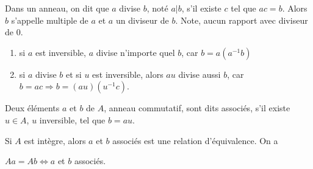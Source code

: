 \documentclass[12pt,a4paper]{article}
\begin{document}
\begin{flushleft}
\begin{mydef}
Dans un anneau, on dit que $a$ divise $ b $, noté $ a | b $, s'il existe $ c $ tel que $ ac = b $. Alors $ b $ s'appelle multiple de $ a $ et $ a $ un diviseur de  $b $. Note, aucun rapport avec diviseur de $ 0 $.
\end{mydef}

\begin{rem}
\begin{enumerate}
\item si $ a $ est inversible, $ a $ divise n'importe quel $ b $, car $ b = a (a^{-1} b) $
\item si $ a $ divise $ b $ et si $ u $ est inversible, alors $ au $ divise aussi $ b $, car $b = ac \Rightarrow b = (au) (u^{-1} c)$.
\end{enumerate}
\end{rem}

\begin{mydef}
Deux éléments $a$ et $b$ de $A$, anneau commutatif, sont dits associés, s'il existe $u \in A$, $u$ inversible, tel que $ b = au$.
\end{mydef}

\begin{prop}
Si $A$ est intègre, alors $a$ et $b$ associés est une relation d'équivalence. On a\\
\begin{center}
$Aa = Ab \Leftrightarrow a $ et $b$ associés.
\end{center}
\end{prop}






\end{flushleft}


 
\end{document}
